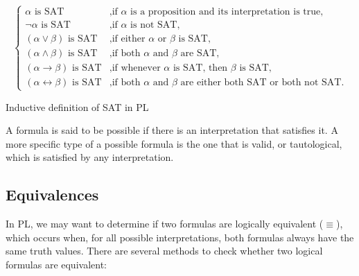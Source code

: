 \begin{table}[h]
\[
\left\{
\begin{array}{ll}
    \alpha \text{ is SAT}  & \text{,if } \alpha \text{ is a proposition and its interpretation is true}, \\
    \neg \alpha \text{ is SAT} & \text{,if } \alpha \text{ is not SAT,} \\
    (\alpha \lor \beta) \text{ is SAT} & \text{,if either } \alpha \text{ or } \beta \text{ is SAT,} \\
    (\alpha \land \beta) \text{ is SAT} & \text{,if both } \alpha \text{ and } \beta \text{ are SAT,} \\
    (\alpha \rightarrow \beta) \text{ is SAT} & \text{,if whenever } \alpha \text{ is SAT, then } \beta \text{ is SAT,} \\
    (\alpha \leftrightarrow \beta) \text{ is SAT} & \text{,if both } \alpha \text{ and } \beta \text{ are either both SAT or both not SAT.}
\end{array}
\right.
\]

\caption{Inductive definition of SAT in \gls{PL}}
\label{tab:sat_rules}
\end{table}

A formula is said to be possible if there is an interpretation that satisfies it. A more specific type of a possible formula is the one that is valid, or tautological, which is satisfied by any interpretation.

\subsection{Equivalences}
\label{chap:prop-equivalences}
In \gls{PL}, we may want to determine if two formulas are logically equivalent (\(\equiv\)), which occurs when, for all possible interpretations, both formulas always have the same truth values. There are several methods to check whether two logical formulas are equivalent:

